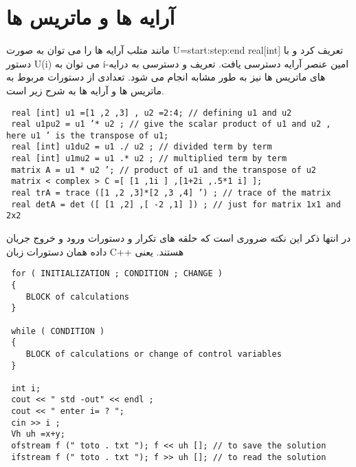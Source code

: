 \section{آرایه ها و ماتریس ها}
مانند متلب آرایه ها را می توان به صورت  U=start:step:end real[int] تعریف کرد و با دستور U(i) می توان به i-امین عنصر آرایه دسترسی یافت. تعریف و دسترسی به درایه های ماتریس ها نیز به طور مشابه انجام می شود. تعدادی از دستورات مربوط به ماتریس ها و آرایه ها به شرح زیر است.
\begin{LTR}
	\begin{lstlisting}
 real [int] u1 =[1 ,2 ,3] , u2 =2:4; // defining u1 and u2
 real u1pu2 = u1 ’* u2 ; // give the scalar product of u1 and u2 , here u1 ’ is the transpose of u1;
 real [int] u1du2 = u1 ./ u2 ; // divided term by term
 real [int] u1mu2 = u1 .* u2 ; // multiplied term by term
 matrix A = u1 * u2 ’; // product of u1 and the transpose of u2
 matrix < complex > C =[ [1 ,1i ] ,[1+2i ,.5*1 i] ];
 real trA = trace ([1 ,2 ,3]*[2 ,3 ,4] ’) ; // trace of the matrix
 real detA = det ([ [1 ,2] ,[ -2 ,1] ]) ; // just for matrix 1x1 and 2x2
	\end{lstlisting}
\end{LTR}
 در انتها ذکر این نکته ضروری است که حلقه های تکرار و دستورات ورود و خروج جریان داده همان دستورات زبان C++ هستند. یعنی
 \begin{LTR}
 	\begin{lstlisting}
 for ( INITIALIZATION ; CONDITION ; CHANGE )
 { 
 	BLOCK of calculations 
 }
 	
 while ( CONDITION ) 
 {
 	BLOCK of calculations or change of control variables
 }
 
 int i;
 cout << " std -out" << endl ;
 cout << " enter i= ? ";
 cin >> i ;
 Vh uh =x+y;
 ofstream f (" toto . txt "); f << uh []; // to save the solution
 ifstream f (" toto . txt "); f >> uh []; // to read the solution
 	\end{lstlisting}
 \end{LTR}










